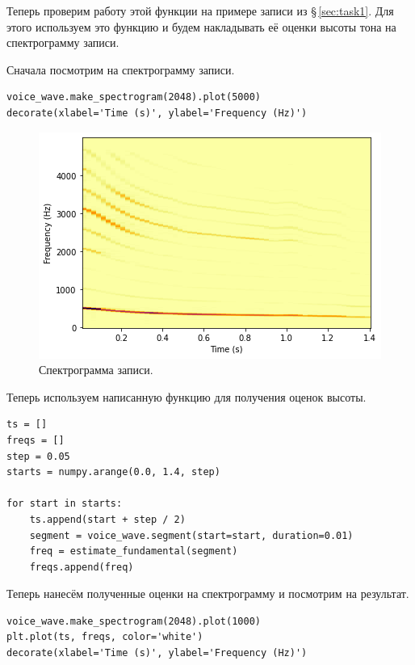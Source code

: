 \documentclass[a4paper, 14pt]{extarticle}
\begin{document}
    Теперь проверим работу этой функции на примере записи из \S\,\ref{sec:task1}.
    Для этого используем это функцию и будем накладывать её оценки высоты тона на спектрограмму записи.

    Сначала посмотрим на спектрограмму записи.

    \begin{lstlisting}[caption= Полуение спектрограммы., label={lst:task2_spectrogram}]
voice_wave.make_spectrogram(2048).plot(5000)
decorate(xlabel='Time (s)', ylabel='Frequency (Hz)')    \end{lstlisting}

    \begin{figure}[h]
        \centering
        \includegraphics[width=0.7\linewidth]{resources/Images/task2_spectrogram}
        \caption{Спектрограмма записи.}
        \label{fig:task2_spectrogram}
    \end{figure}

    Теперь используем написанную функцию для получения оценок высоты.

    \begin{lstlisting}[caption= Полуение оценок высоты тона., label={lst:task2_grades}]
ts = []
freqs = []
step = 0.05
starts = numpy.arange(0.0, 1.4, step)

for start in starts:
    ts.append(start + step / 2)
    segment = voice_wave.segment(start=start, duration=0.01)
    freq = estimate_fundamental(segment)
    freqs.append(freq)  \end{lstlisting}

    Теперь нанесём полученные оценки на спектрограмму и посмотрим на результат.

    \begin{lstlisting}[caption= Сравнение полученных оценок со спектрограммой., label={lst:task2_grades_spectrogram}]
voice_wave.make_spectrogram(2048).plot(1000)
plt.plot(ts, freqs, color='white')
decorate(xlabel='Time (s)', ylabel='Frequency (Hz)')    \end{lstlisting}
\end{document}
